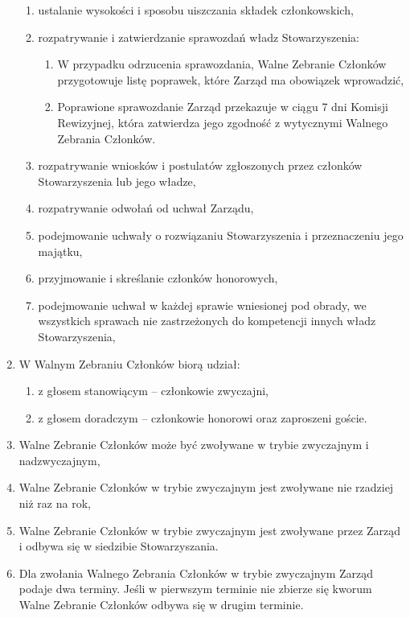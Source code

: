 \documentclass{article}
\begin{document}
\begin{enumerate}
\begin{enumerate}
        \item ustalanie wysokości i sposobu uiszczania składek członkowskich,
        \item rozpatrywanie i zatwierdzanie sprawozdań władz Stowarzyszenia:
          \begin{enumerate}
            \item W przypadku odrzucenia sprawozdania, Walne Zebranie Członków przygotowuje listę poprawek, które Zarząd ma obowiązek wprowadzić,
            \item Poprawione sprawozdanie Zarząd przekazuje w ciągu 7 dni Komisji Rewizyjnej, która zatwierdza jego zgodność z wytycznymi Walnego Zebrania Członków.
          \end{enumerate}
        \item rozpatrywanie wniosków i postulatów zgłoszonych przez członków Stowarzyszenia lub jego władze,
        \item rozpatrywanie odwołań od uchwał Zarządu,
        \item podejmowanie uchwały o rozwiązaniu Stowarzyszenia i przeznaczeniu jego majątku,
        \item przyjmowanie i skreślanie członków honorowych,
        \item podejmowanie uchwał w każdej sprawie wniesionej pod obrady, we wszystkich sprawach nie zastrzeżonych do kompetencji innych władz Stowarzyszenia,
      \end{enumerate}
        \item W Walnym Zebraniu Członków biorą udział:
          \begin{enumerate}
            \item z głosem stanowiącym – członkowie zwyczajni,
            \item z głosem doradczym – członkowie honorowi oraz zaproszeni goście.
          \end{enumerate}
        \item Walne Zebranie Członków może być zwoływane w trybie zwyczajnym i nadzwyczajnym,
        \item Walne Zebranie Członków w trybie zwyczajnym jest zwoływane nie rzadziej niż raz na rok,
        \item Walne Zebranie Członków w trybie zwyczajnym jest zwoływane przez Zarząd i odbywa się w siedzibie Stowarzyszania.
    \item Dla zwołania Walnego Zebrania Członków w trybie zwyczajnym Zarząd podaje dwa terminy. Jeśli w pierwszym terminie nie zbierze się kworum Walne Zebranie Członków odbywa się w drugim terminie.

\end{enumerate}
\end{document}
